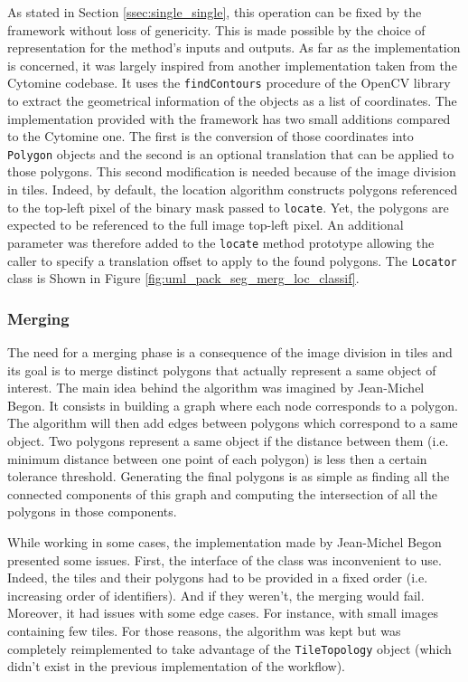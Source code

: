 As stated in Section \ref{ssec:single_single}, this operation can be fixed by the framework without loss of genericity. This is made possible by the choice of representation for the method's inputs and outputs. As far as the implementation is concerned, it was largely inspired from another implementation taken from the Cytomine codebase. It uses the \texttt{findContours} procedure of the OpenCV library to extract the geometrical information of the objects as a list of coordinates. The implementation provided with the framework has two small additions compared to the Cytomine one. The first is the conversion of those coordinates into \texttt{Polygon} objects and the second is an optional translation that can be applied to those polygons. This second modification is needed because of the image division in tiles. Indeed, by default, the location algorithm constructs polygons referenced to the top-left pixel of the binary mask passed to \texttt{locate}. Yet, the polygons are expected to be referenced to the full image top-left pixel. An additional parameter was therefore added to the \texttt{locate} method prototype allowing the caller to specify a translation offset to apply to the found polygons. The \texttt{Locator} class is Shown in Figure \ref{fig:uml_pack_seg_merg_loc_classif}.

\subsubsection{Merging}
\label{sssec:merging}
The need for a merging phase is a consequence of the image division in tiles and its goal is to merge distinct polygons that actually represent a same object of interest. The main idea behind the algorithm was imagined by Jean-Michel Begon. It consists in building a graph where each node corresponds to a polygon. The algorithm will then add edges between polygons which correspond to a same object. Two polygons represent a same object if the distance between them (i.e. minimum distance between one point of each polygon) is less then a certain tolerance threshold. Generating the final polygons is as simple as finding all the connected components of this graph and computing the intersection of all the polygons in those components. 

While working in some cases, the implementation made by Jean-Michel Begon presented some issues. First, the interface of the class was inconvenient to use. Indeed, the tiles and their polygons had to be provided in a fixed order (i.e. increasing order of identifiers). And if they weren't, the merging would fail. Moreover, it had issues with some edge cases. For instance, with small images containing few tiles. For those reasons, the algorithm was kept but was completely reimplemented to take advantage of the \texttt{TileTopology} object (which didn't exist in the previous implementation of the workflow). 

